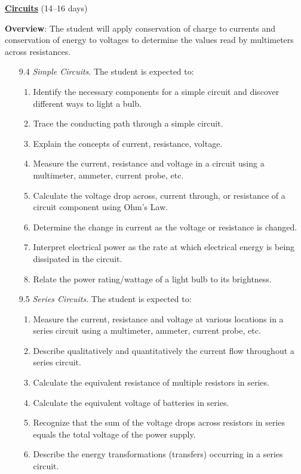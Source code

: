 \documentclass[dvipsnames]{article}
\begin{document}
\textbf{\underline{Circuits}} (14--16 days)

\textbf{Overview}: The student will apply conservation of charge to currents and conservation of energy to voltages to determine the values read by multimeters across resistances.

\begin{enumerate}
    \item[9.4] \textit{Simple Circuits}. The student is expected to:
    \begin{enumerate}
        \item Identify the necessary components for a simple circuit and discover different ways to light a bulb.
        \item Trace the conducting path through a simple circuit.
        \item Explain the concepts of current, resistance, voltage.
        \item Measure the current, resistance and voltage in a circuit using a multimeter, ammeter, current probe, etc.
        \item Calculate the voltage drop across, current through, or resistance of a circuit component using Ohm's Law.
        \item Determine the change in current as the voltage or resistance is changed.
        \item Interpret electrical power as the rate at which electrical energy is being dissipated in the circuit.
        \item Relate the power rating/wattage of a light bulb to its brightness.
    \end{enumerate}
    \item[9.5] \textit{Series Circuits}. The student is expected to:
    \begin{enumerate}
        \item Measure the current, resistance and voltage at various locations in a series circuit using a multimeter, ammeter, current probe, etc.
        \item Describe qualitatively and quantitatively the current flow throughout a series circuit.
        \item Calculate the equivalent resistance of multiple resistors in series.
        \item Calculate the equivalent voltage of batteries in series.
        \item Recognize that the sum of the voltage drops across resistors in series equals the total voltage of the power supply.
        \item Describe the energy transformations (transfers) occurring in a series circuit.

\end{enumerate}
\end{enumerate}
\end{document}
